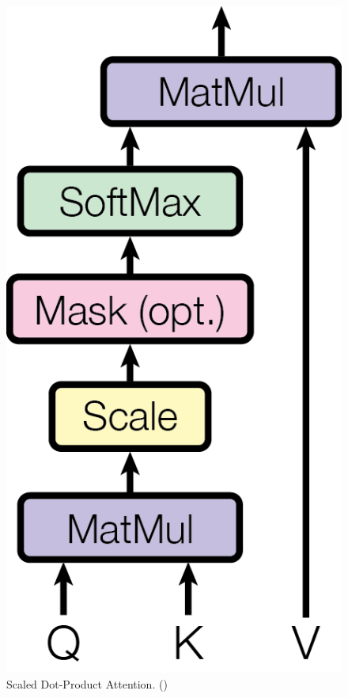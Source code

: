 \begin{figure}
\begin{minipage}[b]{0.5\textwidth}
    \centering
    \includegraphics[scale=0.7]{images/ModalNet-19}
    \caption{Scaled Dot-Product Attention. ()}
    \label{fig:dot-att}
  \end{minipage}
\end{figure}

